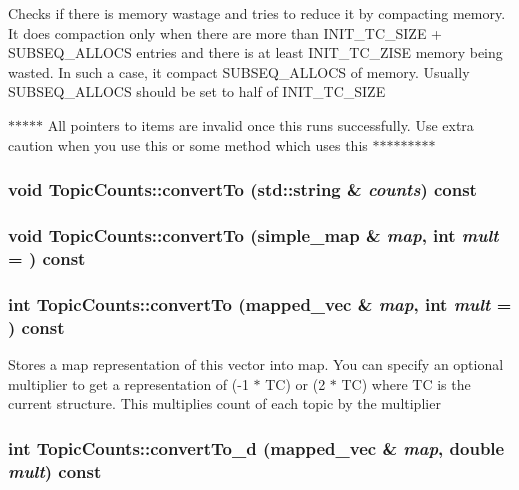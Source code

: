 \label{struct_topic_counts_aa00483314f56e5c97f7feec15cf6dde2}
Checks if there is memory wastage and tries to reduce it by compacting memory. It does compaction only when there are more than INIT\_\-TC\_\-SIZE + SUBSEQ\_\-ALLOCS entries and there is at least INIT\_\-TC\_\-ZISE memory being wasted. In such a case, it compact SUBSEQ\_\-ALLOCS of memory. Usually SUBSEQ\_\-ALLOCS should be set to half of INIT\_\-TC\_\-SIZE

$\ast$$\ast$$\ast$$\ast$$\ast$ All pointers to items are invalid once this runs successfully. Use extra caution when you use this or some method which uses this $\ast$$\ast$$\ast$$\ast$$\ast$$\ast$$\ast$$\ast$$\ast$ \hypertarget{struct_topic_counts_a9550ee80a5fbe0d708b4f760f897d2d5}{
\subsubsection[{convertTo}]{\setlength{\rightskip}{0pt plus 5cm}void TopicCounts::convertTo (std::string \& {\em counts}) const}}
\label{struct_topic_counts_a9550ee80a5fbe0d708b4f760f897d2d5}
\hypertarget{struct_topic_counts_a874b4422e106155a6a4c09eddf6ff459}{
\subsubsection[{convertTo}]{\setlength{\rightskip}{0pt plus 5cm}void TopicCounts::convertTo ({\bf simple\_\-map} \& {\em map}, \/  int {\em mult} = {}) const}}
\label{struct_topic_counts_a874b4422e106155a6a4c09eddf6ff459}
\hypertarget{struct_topic_counts_a2db273b308ba9485c0cb87600c141936}{
\subsubsection[{convertTo}]{\setlength{\rightskip}{0pt plus 5cm}int TopicCounts::convertTo ({\bf mapped\_\-vec} \& {\em map}, \/  int {\em mult} = {}) const}}
\label{struct_topic_counts_a2db273b308ba9485c0cb87600c141936}
Stores a map representation of this vector into map. You can specify an optional multiplier to get a representation of (-\/1 $\ast$ TC) or (2 $\ast$ TC) where TC is the current structure. This multiplies count of each topic by the multiplier \hypertarget{struct_topic_counts_a966dfd85c2c14918bed470515e88aa3b}{
\subsubsection[{convertTo\_\-d}]{\setlength{\rightskip}{0pt plus 5cm}int TopicCounts::convertTo\_\-d ({\bf mapped\_\-vec} \& {\em map}, \/  double {\em mult}) const}}
